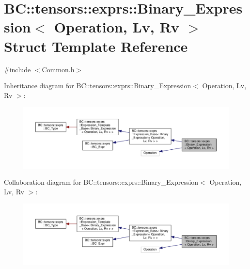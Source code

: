 \hypertarget{structBC_1_1tensors_1_1exprs_1_1Binary__Expression}{}\section{BC\+:\+:tensors\+:\+:exprs\+:\+:Binary\+\_\+\+Expression$<$ Operation, Lv, Rv $>$ Struct Template Reference}
\label{structBC_1_1tensors_1_1exprs_1_1Binary__Expression}


{\ttfamily \#include $<$Common.\+h$>$}



Inheritance diagram for BC\+:\+:tensors\+:\+:exprs\+:\+:Binary\+\_\+\+Expression$<$ Operation, Lv, Rv $>$\+:
\nopagebreak
\begin{figure}[H]
\begin{center}
\leavevmode
\includegraphics[width=350pt]{structBC_1_1tensors_1_1exprs_1_1Binary__Expression__inherit__graph}
\end{center}
\end{figure}


Collaboration diagram for BC\+:\+:tensors\+:\+:exprs\+:\+:Binary\+\_\+\+Expression$<$ Operation, Lv, Rv $>$\+:
\nopagebreak
\begin{figure}[H]
\begin{center}
\leavevmode
\includegraphics[width=350pt]{structBC_1_1tensors_1_1exprs_1_1Binary__Expression__coll__graph}
\end{center}
\end{figure}

